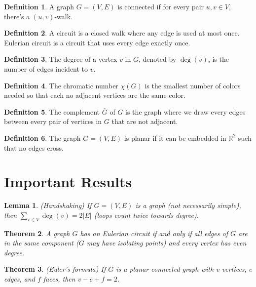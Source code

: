 \documentclass{article}
\newtheorem{theorem}{Theorem}[section]
\newtheorem{lemma}[theorem]{Lemma}
\theoremstyle{definition}
\newtheorem{definition}{Definition}[section]
\theoremstyle{remark}
\begin{document}
\begin{definition}
A graph $G = (V, E)$ is connected if for every pair $u, v \in V$, there's a $(u, v)$-walk. 
\end{definition}

\begin{definition}
A circuit is a closed walk where any edge is used at most once. Eulerian circuit is a circuit that uses every edge exactly once. 
\end{definition}

\begin{definition}
The degree of a vertex $v$ in $G$, denoted by $\deg(v)$, is the number of edges incident to $v$. 
\end{definition}

\begin{definition}
The chromatic number $\chi(G)$ is the smallest number of colors needed so that each no adjacent vertices are the same color.
\end{definition}

\begin{definition}
The complement $\overline{G}$ of $G$ is the graph where we draw every edges between every pair of vertices in $G$ that are not adjacent.
\end{definition}

\begin{definition}
The graph $G = (V, E)$ is planar if it can be embedded in $\mathbb{R}^{2}$ such that no edges cross. 
\end{definition}

\section{Important Results}
\begin{lemma}(Handshaking)
If $G = (V, E)$ is a graph (not necessarily simple), then $\sum_{v \in V} \deg(v) = 2|E|$ (loops count twice towards degree).  
\end{lemma}

\begin{theorem}
A graph $G$ has an Eulerian circuit if and only if all edges of $G$ are in the same component ($G$ may have isolating points) and every vertex has even degree.  
\end{theorem}

\begin{theorem}(Euler's formula)
If $G$ is a planar-connected graph with $v$ vertices, $e$ edges, and $f$ faces, then $v - e + f = 2$. 
\end{theorem}
\end{document}
